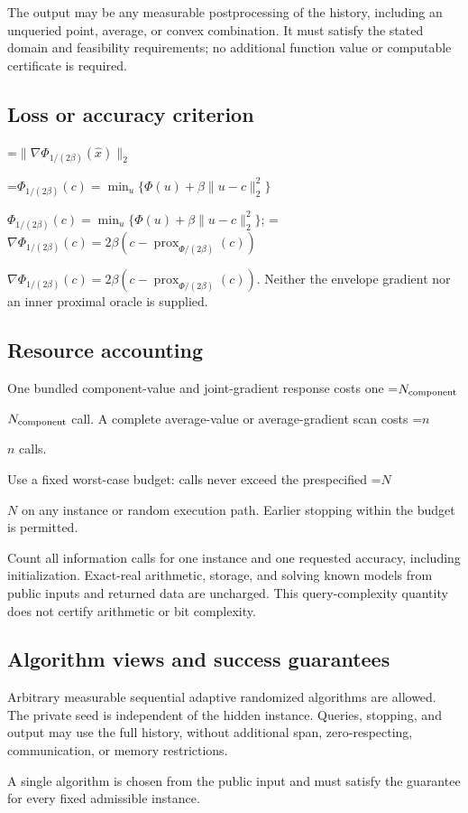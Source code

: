 \documentclass[10pt,a4paper]{article}
\newcommand{\AtlasMath}[1]{\par\begingroup\centering\setbox0=\hbox{$\displaystyle #1$}\ifdim\wd0>1.4\linewidth\typeout{ATLAS WIDE FORMULA: \the\wd0}\fi\ifdim\wd0>\linewidth\resizebox{\linewidth}{!}{\box0}\else\box0\fi\par\endgroup}
\newcommand{\AtlasInlineMath}[1]{\begingroup\setbox0=\hbox{$#1$}\ifdim\wd0>.4\linewidth\endgroup\AtlasMath{#1}\else\endgroup$#1$\fi}
\begin{document}
The output may be any measurable postprocessing of the history, including an unqueried point, average, or convex combination. It must satisfy the stated domain and feasibility requirements; no additional function value or computable certificate is required.

\subsection{Loss or accuracy criterion}

\AtlasMath{\|\nabla\Phi_{1/(2\beta)}(\widehat{x})\|_2}


\AtlasInlineMath{\Phi_{1/(2\beta)}(c)=\min_u\{\Phi(u)+\beta\|u-c\|_2^2\}}; \AtlasInlineMath{\nabla\Phi_{1/(2\beta)}(c)=2\beta(c-\operatorname{prox}_{\Phi/(2\beta)}(c))}. Neither the envelope gradient nor an inner proximal oracle is supplied.

\subsection{Resource accounting}
One bundled component-value and joint-gradient response costs one \AtlasInlineMath{N_{\rm component}} call. A complete average-value or average-gradient scan costs \AtlasInlineMath{n} calls.

Use a fixed worst-case budget: calls never exceed the prespecified \AtlasInlineMath{N} on any instance or random execution path. Earlier stopping within the budget is permitted.

Count all information calls for one instance and one requested accuracy, including initialization. Exact-real arithmetic, storage, and solving known models from public inputs and returned data are uncharged. This query-complexity quantity does not certify arithmetic or bit complexity.

\subsection{Algorithm views and success guarantees}
Arbitrary measurable sequential adaptive randomized algorithms are allowed. The private seed is independent of the hidden instance. Queries, stopping, and output may use the full history, without additional span, zero-respecting, communication, or memory restrictions.

A single algorithm is chosen from the public input and must satisfy the guarantee for every fixed admissible instance.
\end{document}
